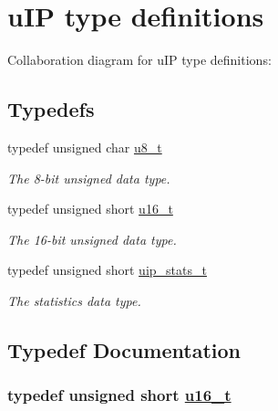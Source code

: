 \hypertarget{a00070}{
\section{u\-IP type definitions}
\label{a00070}
}


Collaboration diagram for u\-IP type definitions:

\subsection*{Typedefs}
\begin{CompactItemize}
\item 
typedef unsigned char \hyperlink{a00070_ge081489b4906f65a3cb18e9fbe9f8d23}{u8\_\-t}
\begin{CompactList}\small\item\em The 8-bit unsigned data type. \item\end{CompactList}\item 
typedef unsigned short \hyperlink{a00070_gfc6499c1f28697aa3bfc2804d496fd11}{u16\_\-t}
\begin{CompactList}\small\item\em The 16-bit unsigned data type. \item\end{CompactList}\item 
typedef unsigned short \hyperlink{a00070_g727459e5c4f777543c81ffffa3df3f0c}{uip\_\-stats\_\-t}
\begin{CompactList}\small\item\em The statistics data type. \item\end{CompactList}\end{CompactItemize}


\subsection{Typedef Documentation}
\hypertarget{a00070_gfc6499c1f28697aa3bfc2804d496fd11}{
\subsubsection[u16\_\-t]{\setlength{\rightskip}{0pt plus 5cm}typedef unsigned short \hyperlink{a00070_gfc6499c1f28697aa3bfc2804d496fd11}{u16\_\-t}}}
\label{a00070_gfc6499c1f28697aa3bfc2804d496fd11}


